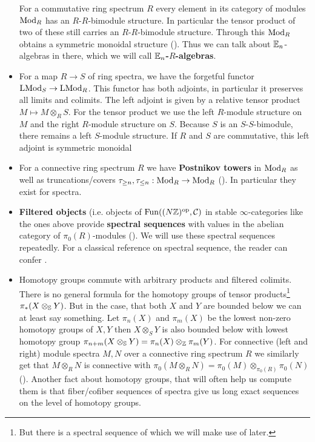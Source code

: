 \begin{itemize}
    For a commutative ring spectrum $R$ every element in its category of modules $\Mod_R$ has an $R$-$R$-bimodule structure. In particular the tensor product of two of these still carries an $R$-$R$-bimodule structure. Through this $\Mod_R$ obtains a symmetric monoidal structure (\cite[Theorem~4.5.2.1]{lurie2017higher}). Thus we can talk about $\En$-algebras in there, which we will call \textbf{$\En$-$R$-algebras}.
    \item For a map $R\to S$ of ring spectra, we have the forgetful functor $\LMod_S\to \LMod_R$. This functor has both adjoints, in particular it preserves all limits and colimits. The left adjoint is given by a relative tensor product $M\mapsto M\otimes_R S$. For the tensor product we use the left $R$-module structure on $M$ and the right $R$-module structure on $S$. Because $S$ is an $S$-$S$-bimodule, there remains a left $S$-module structure. If $R$ and $S$ are commutative, this left adjoint is symmetric monoidal \cite[Section~4.5.3]{lurie2017higher}
    \item For a connective ring spectrum $R$ we have \textbf{Postnikov towers} in $\Mod_R$ as well as truncations/covers $\tau_{\geq n},\tau_{\leq n}:\Mod_R\to \Mod_R$ (\cite[Proposition~7.1.1.13]{lurie2017higher}). In particular they exist for spectra.
    \item \textbf{Filtered objects} (i.e. objects of $\Fun((N\Z)^{\op},\cC)$ in stable $\infty$-categories like the ones above provide \textbf{spectral sequences} with values in the abelian category of $\pi_0(R)$-modules (\cite[Section~1.2.2]{lurie2017higher}). 
    We will use these spectral sequences repeatedly.
    For a classical reference on spectral sequence, the reader can confer \cite[Chapter~5]{weibel1994introduction}.
    \item Homotopy groups commute with arbitrary products and filtered colimits. There is no general formula for the homotopy groups of tensor products\footnote{But there is a spectral sequence of which we will make use of later.} $\pi_*(X\otimes_\S Y)$. 
    But in the case, that both $X$ and $Y$ are bounded below we can at least say something. Let $\pi_n(X)$ and $\pi_m(X)$ be the lowest non-zero homotopy groups of $X,Y$ then $X\otimes_S Y$ is also bounded below with lowest homotopy group $\pi_{n+m}(X\otimes_\S Y)=\pi_n(X)\otimes_\Z\pi_m(Y)$. 
    For connective (left and right) module spectra $M,N$ over a connective ring spectrum $R$ we similarly get that $M\otimes_R N$ is connective with $\pi_0(M\otimes_R N)=\pi_0(M)\otimes_{\pi_0(R)}\pi_0(N)$ (\cite[Corollary~7.2.1.23]{lurie2017higher}). Another fact about homotopy groups, that will often help us compute them is that fiber/cofiber sequences of spectra give us long exact sequences on the level of homotopy groups.

\end{itemize}

